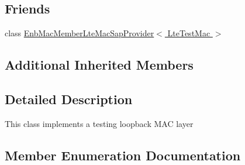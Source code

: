 \subsection*{Friends}
\begin{DoxyCompactItemize}
\item 
class \hyperlink{classns3_1_1LteTestMac_ad3c924cc5faf75c38c868fb9c77a83e1}{Enb\+Mac\+Member\+Lte\+Mac\+Sap\+Provider$<$ Lte\+Test\+Mac $>$}
\end{DoxyCompactItemize}
\subsection*{Additional Inherited Members}


\subsection{Detailed Description}
This class implements a testing loopback M\+AC layer 

\subsection{Member Enumeration Documentation}
